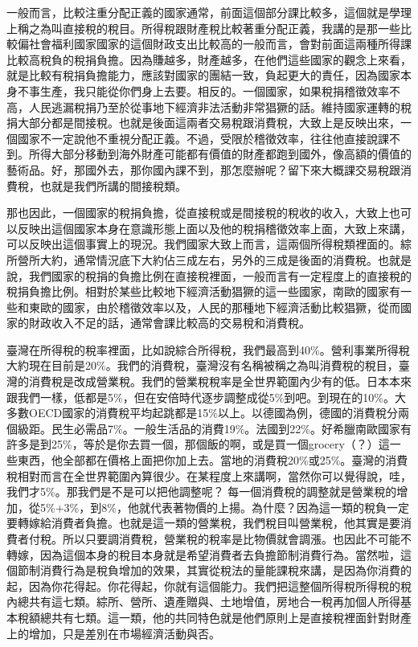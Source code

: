 \documentclass[oneside,sub3section]{ctexbook}
\begin{document}
一般而言，比較注重分配正義的國家通常，前面這個部分課比較多，這個就是學理上稱之為叫直接稅的稅目。所得稅跟財產稅比較著重分配正義，我講的是那一些比較偏社會福利國家國家的這個財政支出比較高的一般而言，會對前面這兩種所得課比較高稅負的稅捐負擔。因為賺越多，財產越多，在他們這些國家的觀念上來看，就是比較有稅捐負擔能力，應該對國家的團結一致，負起更大的責任，因為國家本身不事生產，我只能從你們身上去要。相反的。一個國家，如果稅捐稽徵效率不高，人民逃漏稅捐乃至於從事地下經濟非法活動非常猖獗的話。維持國家運轉的稅捐大部分都是間接稅。也就是後面這兩者交易稅跟消費稅，大致上是反映出來，一個國家不一定說他不重視分配正義。不過，受限於稽徵效率，往往他直接說課不到。所得大部分移動到海外財產可能都有價值的財產都跑到國外，像高額的價值的藝術品。好，那國外去，那你國內課不到，那怎麼辦呢？留下來大概課交易稅跟消費稅，也就是我們所講的間接稅類。

那也因此，一個國家的稅捐負擔，從直接稅或是間接稅的稅收的收入，大致上也可以反映出這個國家本身在意識形態上面以及他的稅捐稽徵效率上面，大致上來講，可以反映出這個事實上的現況。我們國家大致上而言，這兩個所得稅類裡面的。綜所營所大約，通常情況底下大約佔三成左右，另外的三成是後面的消費稅。也就是說，我們國家的稅捐的負擔比例在直接稅裡面，一般而言有一定程度上的直接稅的稅捐負擔比例。相對於某些比較地下經濟活動猖獗的這一些國家，南歐的國家有一些和東歐的國家，由於稽徵效率以及，人民的那種地下經濟活動比較猖獗，從而國家的財政收入不足的話，通常會課比較高的交易稅和消費稅。

臺灣在所得稅的稅率裡面，比如說綜合所得稅，我們最高到40\%。營利事業所得稅大約現在目前是20\%。我們的消費稅，臺灣沒有名稱被稱之為叫消費稅的稅目，臺灣的消費稅是改成營業稅。我們的營業稅稅率是全世界範圍內少有的低。日本本來跟我們一樣，低都是5\%，但在安倍時代逐步調整成從5\%到吧。到現在的10\%。大多數OECD國家的消費稅平均起跳都是15\%以上。以德國為例，德國的消費稅分兩個級距。民生必需品7\%。一般生活品的消費19\%。法國到22\%。好希臘南歐國家有許多是到25\%，等於是你去買一個，那個飯的啊，或是買一個grocery（？）這一些東西，他全部都在價格上面把你加上去。當地的消費稅20\%或25\%。臺灣的消費稅相對而言在全世界範圍內算很少。在某程度上來講啊，當然你可以覺得說，哇，我們才5\%。那我們是不是可以把他調整呢？ 每一個消費稅的調整就是營業稅的增加，從5\%+3\%，到8\%，他就代表著物價的上揚。為什麼？因為這一類的稅負一定要轉嫁給消費者負擔。也就是這一類的營業稅，我們稅目叫營業稅，他其實是要消費者付稅。所以只要調消費稅，營業稅的稅率是比物價就會調漲。也因此不可能不轉嫁，因為這個本身的稅目本身就是希望消費者去負擔節制消費行為。當然啦，這個節制消費行為是稅負增加的效果，其實從稅法的量能課稅來講，是因為你消費的起，因為你花得起。你花得起，你就有這個能力。我們把這整個所得稅所得稅的稅內總共有這七類。綜所、營所、遺產贈與、土地增值，房地合一稅再加個人所得基本稅額總共有七類。這一類，他的共同特色就是他們原則上是直接稅裡面針對財產上的增加，只是差別在市場經濟活動與否。
\end{document}

